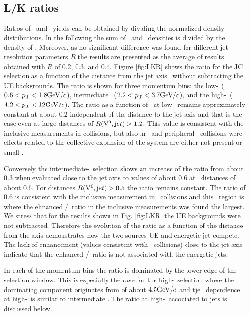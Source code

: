 \subsection{L/K ratios}

Ratios of \lda\ and \ks\ yields can be obtained by dividing the normalized density distributions. In the following the sum of \lda\ and \alda\ densities is divided by the density of \ks. 
Moreover, as no significant difference was found for different jet resolution parameters $R$ the results are presented as the average of results obtained with $R$ of 0.2, 0.3, and 0.4. 
Figure \ref{fig:LKR} shows the ratio for the JC selection as a function of the distance from the jet axis \rvzerojet\ without subtracting the UE backgrounds. 
The ratio is shown for three momentum bins: the low-\pt\ ($0.6 <p_{\mathrm{T}} <1.8 \mathrm{GeV}/c$), inermediate \pt\ ($2.2 < p_{\mathrm{T}} < 3.7 \mathrm{GeV}/c$), and the high-\pt\ ($4.2 < p_{\mathrm{T}} < 12 \mathrm{GeV}/c$). 
The ratio as a function of \rvzerojet\ at low-\pt\ remains approximately constant at about $0.2$ independent of the distance to the jet axis and that is the case even at large distances of $R({\rm V}^0,{\mathrm jet}) > 1.2$. 
This value is consistent with the inclusive measurements in \pPb collisions, but also in \pp\ and peripheral \PbPb\ collisions were effects related to the collective expansion of the system are either not-present or small \cite{Abelev:2014uua}.

Conversely the intermediate-\pt\ selection shows an increase of the ratio from about $0.3$ when evaluated close to the jet axis to values of about $0.6$ at \rvzerojet\ distances of about $0.5$.
For distances $R({\rm V}^0,{\mathrm jet}) > 0.5$ the ratio remains constant.
The ratio of $0.6$ is consistent with the inclusive measurement in \pPb\ collisions \cite{Abelev:2013haa} and this \pt\ region is where the ehnanced \lda/\ks\ ratio in the inclusive measurements was found the largest.
We stress that for the results shown in Fig. \ref{fig:LKR} the UE backgrounds were not subtracted.
Therefore the evolution of the ratio as a function of the distance from the axis demonstrates how the two sources UE and energetic jet compete.
The lack of enhancement (values consistent with \pp\ collisions) close to the jet axis indicate that the enhanced \lda/\ks\ ratio is not associated with the energetic jets.

In each of the momentum bins the ratio is dominated by the lower edge of the selection window. 
This is especially the case for the high-\pt\ selection where the dominating component originates from \pt of about $4.5 \mathrm{GeV}/c$ and tje \rvzerojet\ dependence at high-\pt\ is similar to intermediate \pt. The ratio at high-\pt\ accociated to jets is discussed below.

